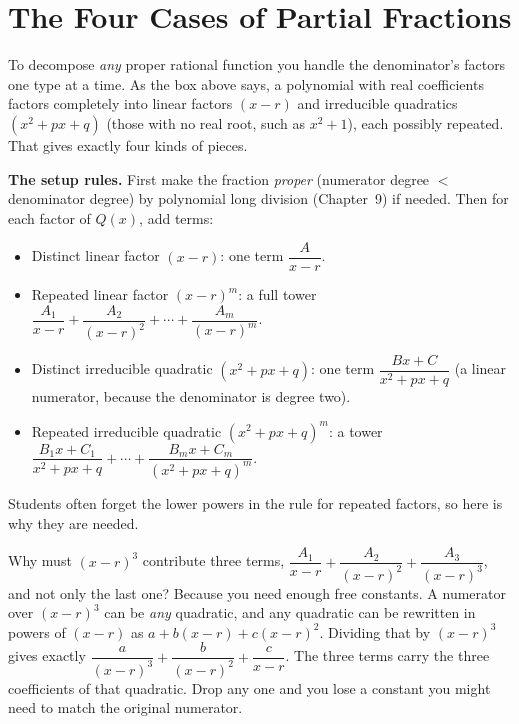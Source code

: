 \section{The Four Cases of Partial Fractions}
\label{ch24:four-cases}

To decompose \emph{any} proper rational function you handle the denominator's
factors one type at a time. As the box above says, a polynomial with real
coefficients factors completely into linear factors $(x-r)$ and irreducible
quadratics $(x^2+px+q)$ (those with no real root, such as $x^2+1$), each
possibly repeated. That gives exactly four kinds of pieces.

\begin{focusbox}
\textbf{The setup rules.} First make the fraction \emph{proper} (numerator
degree $<$ denominator degree) by polynomial long division (Chapter~9) if
needed. Then for each factor of $Q(x)$, add terms:
\begin{itemize}
\item Distinct linear factor $(x-r)$: one term $\dfrac{A}{x-r}$.
\item Repeated linear factor $(x-r)^m$: a full tower
   $\dfrac{A_1}{x-r} + \dfrac{A_2}{(x-r)^2} + \cdots + \dfrac{A_m}{(x-r)^m}$.
\item Distinct irreducible quadratic $(x^2+px+q)$: one term
   $\dfrac{Bx+C}{x^2+px+q}$ (a linear numerator, because the denominator is
   degree two).
\item Repeated irreducible quadratic $(x^2+px+q)^m$: a tower
   $\dfrac{B_1x+C_1}{x^2+px+q} + \cdots + \dfrac{B_mx+C_m}{(x^2+px+q)^m}$.
\end{itemize}
\end{focusbox}

Students often forget the lower powers in the rule for repeated factors, so
here is why they are needed.

\begin{intuitionbox}
Why must $(x-r)^3$ contribute three terms, $\dfrac{A_1}{x-r} +
\dfrac{A_2}{(x-r)^2} + \dfrac{A_3}{(x-r)^3}$, and not only the last one? Because
you need enough free constants. A numerator over $(x-r)^3$ can be \emph{any}
quadratic, and any quadratic can be rewritten in powers of $(x-r)$ as
$a + b(x-r) + c(x-r)^2$. Dividing that by $(x-r)^3$ gives
exactly $\dfrac{a}{(x-r)^3} + \dfrac{b}{(x-r)^2} + \dfrac{c}{x-r}$. The three
terms carry the three coefficients of that quadratic. Drop any one and you
lose a constant you might need to match the original numerator.
\end{intuitionbox}

